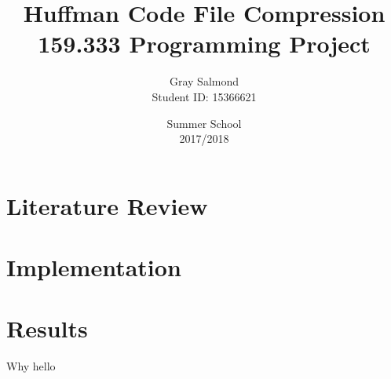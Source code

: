 \documentclass{report}
\title{Huffman Code File Compression\\159.333 Programming Project}
\date{Summer School\\2017/2018}
\author{Gray Salmond\\ Student ID: 15366621}
\begin{document}
\maketitle	
{}	
\newpage



\tableofcontents
\newpage


\chapter{Literature Review}


\chapter{Implementation}


\chapter{Results}

Why hello
\end{document}
